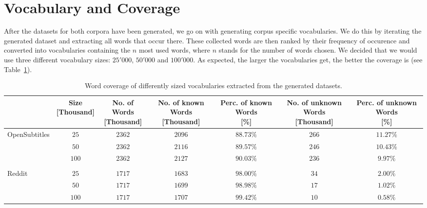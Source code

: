 \section{Vocabulary and Coverage}
\label{data:word_coverage}
After the datasets for both corpora have been generated, we go on with generating corpus specific vocabularies. We do this by iterating the generated dataset and extracting all words that occur there. These collected words are then ranked by their frequency of occurence and converted into vocabularies containing the $n$ most used words, where $n$ stands for the number of words chosen. We decided that we would use three different vocabulary sizes: $25'000$, $50'000$ and $100'000$. As expected, the larger the vocabularies get, the better the coverage is (see Table~\ref{tbl:data:split:corpus:analyze}).
\\
\begin{table}[H]
	\begin{adjustbox}{max width=\textwidth}
		\centering
		\begin{tabular}{lcccccc}
			\toprule
			&\specialcell{Size\\ {[Thousand]}}
			&\specialcell{No. of Words\\ {[Thousand]}}
			&\specialcell{No. of known Words\\ {[Thousand]}}
			&\specialcell{Perc. of known Words \\ {[\%]}}
			&\specialcell{No. of unknown Words \\ {[Thousand]}}
			&\specialcell{Perc. of unknown Words \\ {[\%]}}\\
			\midrule
			OpenSubtitles	&$25$		&$2362$	&$2096$	&$88.73\%$ &$266$	&$11.27\%$\\
							&$50$		&$2362$	&$2116$	&$89.57\%$	&$246$	&$10.43\%$\\
							&$100$	&$2362$	&$2127$	&$90.03\%$	&$236$	&$9.97\%$\\\\
			Reddit		&$25$		&$1717$	&$1683$	&$98.00\%$	&$34$		&$2.00\%$\\
						&$50$		&$1717$	&$1699$	&$98.98\%$	&$17$		&$1.02\%$\\
						&$100$	&$1717$	&$1707$	&$99.42\%$	&$10$		&$0.58\%$\\
			\bottomrule
		\end{tabular}
	\end{adjustbox}
	\caption{Word coverage of differently sized vocabularies extracted from the generated datasets.}
	\label{tbl:data:split:corpus:analyze}
\end{table}

